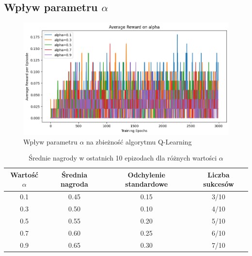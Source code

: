 \documentclass{article}
\begin{document}
\subsection{Wpływ parametru $\alpha$}
\begin{figure}[h!]
    \centering
    \includegraphics[width=\textwidth]{alpha_impact.png}
    \caption{Wpływ parametru $\alpha$ na zbieżność algorytmu Q-Learning}
    \label{fig:alpha_impact}
\end{figure}

\begin{table}[h!]
    \centering
    \caption{Średnie nagrody w ostatnich 10 epizodach dla różnych wartości $\alpha$}
    \label{tab:alpha_impact}
    \begin{tabular}{cccc}
        \toprule
        Wartość $\alpha$ & Średnia nagroda & Odchylenie standardowe & Liczba sukcesów \\ 
        \midrule
        0.1 & 0.45 & 0.15 & 3/10 \\
        0.3 & 0.50 & 0.10 & 4/10 \\
        0.5 & 0.55 & 0.20 & 5/10 \\
        0.7 & 0.60 & 0.25 & 6/10 \\
        0.9 & 0.65 & 0.30 & 7/10 \\
        \bottomrule
    \end{tabular}
\end{table}
\end{document}
